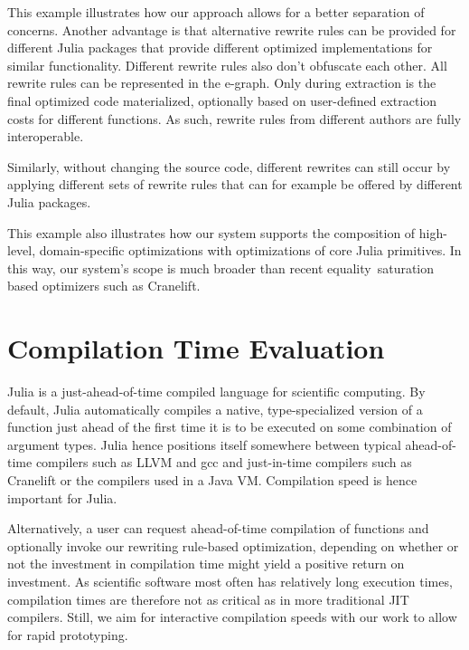 This example illustrates how our approach allows for a better separation of concerns. Another advantage is that alternative rewrite rules can be provided for different Julia packages that provide different optimized implementations for similar functionality.
Different rewrite rules also don't obfuscate each other.
All rewrite rules can be represented in the e-graph.
Only during extraction is the final optimized code materialized, optionally based on user-defined extraction costs for different functions.
As such, rewrite rules from different authors are fully interoperable.

Similarly, without changing the source code, different rewrites can still occur by applying different sets of rewrite rules that can for example be offered by different Julia packages.


This example also illustrates how our system supports the composition of high-level, domain-specific optimizations with optimizations of core Julia primitives. In this way, our system's scope is much broader than recent equality~saturation based optimizers such as Cranelift. 

\section{Compilation Time Evaluation}
\label{sec:compiletime}


Julia is a just-ahead-of-time compiled language for scientific computing. By default, Julia automatically compiles a native, type-specialized version of a function just ahead of the first time it is to be executed on some combination of argument types. Julia hence positions itself somewhere between typical ahead-of-time compilers such as LLVM and gcc and just-in-time compilers such as Cranelift or the compilers used in a Java VM. Compilation speed is hence important for Julia. 

Alternatively, a user can request ahead-of-time compilation of functions and optionally invoke our rewriting rule-based optimization, depending on whether or not the investment in compilation time might yield a positive return on investment. As scientific software most often has relatively long execution times, compilation times are therefore not as critical as in more traditional JIT compilers. Still, we aim for interactive compilation speeds with our work to allow for rapid prototyping.

